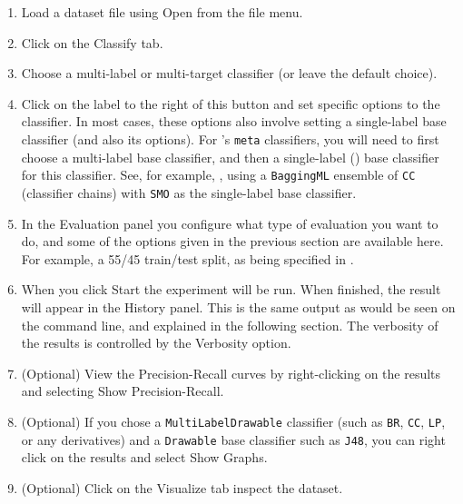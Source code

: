 \documentclass[11pt]{article}
\newcommand{\MEKA}{Meka}
\newcommand{\WEKA}{Weka}
\begin{document}
\begin{enumerate}
	\item Load a dataset file using \textsf{Open} from the file menu. %
	\item Click on the \textsf{Classify} tab.
	\item \textsf{Choose} a multi-label or multi-target classifier (or leave the default choice). 
	\item Click on the label to the right of this button and set specific options to the classifier. In most cases, these options also involve setting a \framework{\WEKA} single-label base classifier (and also its options). For \framework{\MEKA}'s \texttt{meta} classifiers, you will need to first choose a multi-label base classifier, and then a single-label (\framework{\WEKA}) base classifier for this classifier. See, for example, , using a \texttt{BaggingML} ensemble of \texttt{CC} (classifier chains) with \texttt{SMO} as the single-label base classifier.
	\item In the \textsf{Evaluation} panel you configure what type of evaluation you want to do, and some of the options given in the previous section are available here. For example, a 55/45 train/test split, as being specified in .
	\item When you click \textsf{Start} the experiment will be run. When finished, the result will appear in the \textsf{History} panel. This is the same output as would be seen on the command line, and explained in the following section. The verbosity of the results is controlled by the \textsf{Verbosity} option.
	\item (Optional) View the Precision-Recall curves by right-clicking on the results and selecting \textsf{Show Precision-Recall}.
	\item (Optional) If you chose a \texttt{MultiLabelDrawable} classifier (such as \texttt{BR}, \texttt{CC}, \texttt{LP}, or any derivatives) and a \texttt{Drawable} base classifier such as \texttt{J48}, you can right click on the results and select \textsf{Show Graphs}.
	\item (Optional) Click on the \textsf{Visualize} tab inspect the dataset.
\end{enumerate}
\end{document}
